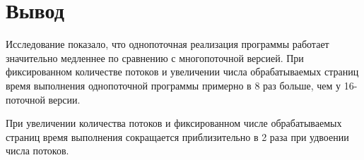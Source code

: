 \clearpage


\section{Вывод}
Исследование показало, что однопоточная реализация программы работает значительно медленнее по сравнению с многопоточной версией. При фиксированном количестве потоков и увеличении числа обрабатываемых страниц время выполнения однопоточной программы примерно в 8 раз больше, чем у 16-поточной версии.

При увеличении количества потоков и фиксированном числе обрабатываемых страниц время выполнения сокращается приблизительно в 2 раза при удвоении числа потоков.



